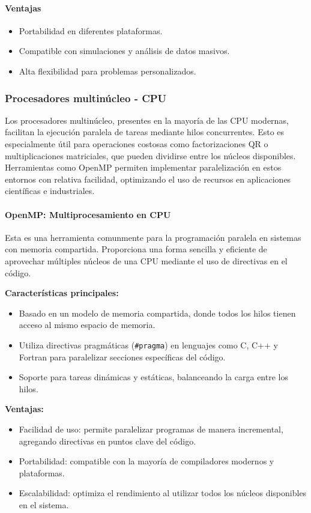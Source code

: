 \documentclass{article}
\begin{document}
\paragraph{Ventajas}
\begin{itemize}
    \item Portabilidad en diferentes plataformas.
    \item Compatible con simulaciones y análisis de datos masivos.
    \item Alta flexibilidad para problemas personalizados.
\end{itemize}

\subsubsection{Procesadores multinúcleo - CPU}
Los procesadores multinúcleo, presentes en la mayoría de las CPU modernas, facilitan la ejecución paralela de tareas mediante hilos concurrentes. Esto es especialmente útil para operaciones costosas como factorizaciones QR o multiplicaciones matriciales, que pueden dividirse entre los núcleos disponibles. Herramientas como OpenMP permiten implementar paralelización en estos entornos con relativa facilidad, optimizando el uso de recursos en aplicaciones científicas e industriales.
\paragraph{OpenMP: Multiprocesamiento en CPU}
Esta es una herramienta comunmente para la programación paralela en sistemas con memoria compartida. Proporciona una forma sencilla y eficiente de aprovechar múltiples núcleos de una CPU mediante el uso de directivas en el código.

\textbf{Características principales:}
\begin{itemize}
    \item Basado en un modelo de memoria compartida, donde todos los hilos tienen acceso al mismo espacio de memoria.
    \item Utiliza directivas pragmáticas (\texttt{\#pragma}) en lenguajes como C, C++ y Fortran para paralelizar secciones específicas del código.
    \item Soporte para tareas dinámicas y estáticas, balanceando la carga entre los hilos.
\end{itemize}

\textbf{Ventajas:}
\begin{itemize}
    \item Facilidad de uso: permite paralelizar programas de manera incremental, agregando directivas en puntos clave del código.
    \item Portabilidad: compatible con la mayoría de compiladores modernos y plataformas.
    \item Escalabilidad: optimiza el rendimiento al utilizar todos los núcleos disponibles en el sistema.
\end{itemize}
\end{document}
